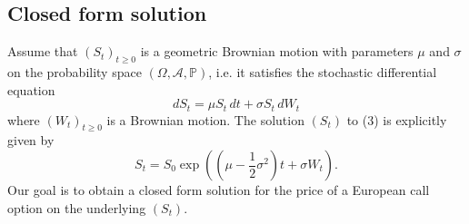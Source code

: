 \documentclass{scrartcl}
\begin{document}
	\subsection{Closed form solution}
	
	Assume that $(S_t)_{t\geq 0}$ is a geometric Brownian motion with parameters $\mu$ and $\sigma$ on the probability space $(\Omega,\mathcal{A},\mathbb{P})$, i.e. it satisfies the stochastic differential equation
	\begin{equation}
		dS_t = \mu S_t\,dt + \sigma S_t\,dW_t
	\end{equation}
	where $(W_t)_{t\geq 0}$ is a Brownian motion. The solution $(S_t)$ to (3) is explicitly given by
	\begin{equation}
		S_t = S_0\exp\left(\left(\mu - \frac{1}{2}\sigma^2\right)t + \sigma W_t\right)\text{.}
	\end{equation}Our goal is to obtain a closed form solution for the price of a European call option on the underlying $(S_t)$.
	
\end{document}
